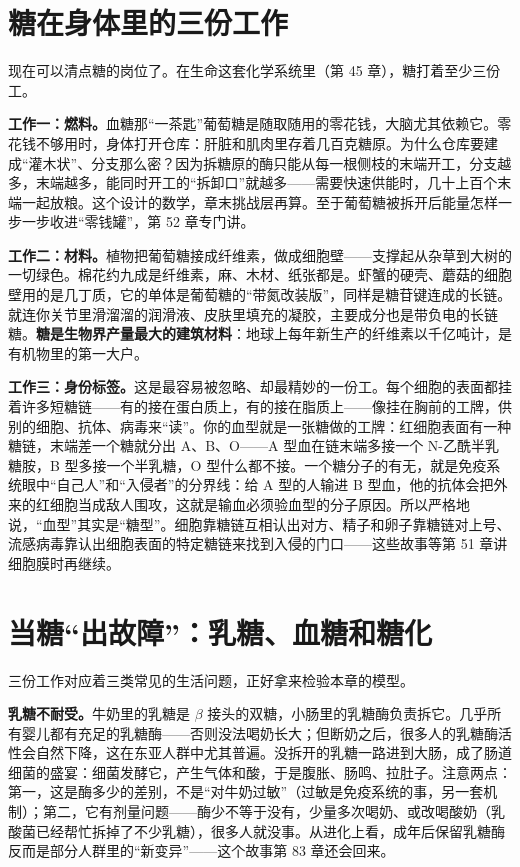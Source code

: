 \section{糖在身体里的三份工作}

现在可以清点糖的岗位了。在生命这套化学系统里（第 45 章），糖打着至少三份工。

\textbf{工作一：燃料。}血糖那“一茶匙”葡萄糖是随取随用的零花钱，大脑尤其依赖它。零花钱不够用时，身体打开仓库：肝脏和肌肉里存着几百克糖原。为什么仓库要建成“灌木状”、分支那么密？因为拆糖原的酶只能从每一根侧枝的末端开工，分支越多，末端越多，能同时开工的“拆卸口”就越多——需要快速供能时，几十上百个末端一起放粮。这个设计的数学，章末挑战层再算。至于葡萄糖被拆开后能量怎样一步一步收进“零钱罐”，第 52 章专门讲。

\textbf{工作二：材料。}植物把葡萄糖接成纤维素，做成细胞壁——支撑起从杂草到大树的一切绿色。棉花约九成是纤维素，麻、木材、纸张都是。虾蟹的硬壳、蘑菇的细胞壁用的是几丁质，它的单体是葡萄糖的“带氮改装版”，同样是糖苷键连成的长链。就连你关节里滑溜溜的润滑液、皮肤里填充的凝胶，主要成分也是带负电的长链糖。\textbf{糖是生物界产量最大的建筑材料}：地球上每年新生产的纤维素以千亿吨计，是有机物里的第一大户。

\textbf{工作三：身份标签。}这是最容易被忽略、却最精妙的一份工。每个细胞的表面都挂着许多短糖链——有的接在蛋白质上，有的接在脂质上——像挂在胸前的工牌，供别的细胞、抗体、病毒来“读”。你的血型就是一张糖做的工牌：红细胞表面有一种糖链，末端差一个糖就分出 A、B、O——A 型血在链末端多接一个 N-乙酰半乳糖胺，B 型多接一个半乳糖，O 型什么都不接。一个糖分子的有无，就是免疫系统眼中“自己人”和“入侵者”的分界线：给 A 型的人输进 B 型血，他的抗体会把外来的红细胞当成敌人围攻，这就是输血必须验血型的分子原因。所以严格地说，“血型”其实是“糖型”。细胞靠糖链互相认出对方、精子和卵子靠糖链对上号、流感病毒靠认出细胞表面的特定糖链来找到入侵的门口——这些故事等第 51 章讲细胞膜时再继续。

\section{当糖“出故障”：乳糖、血糖和糖化}

三份工作对应着三类常见的生活问题，正好拿来检验本章的模型。

\textbf{乳糖不耐受。}牛奶里的乳糖是 $\beta$ 接头的双糖，小肠里的乳糖酶负责拆它。几乎所有婴儿都有充足的乳糖酶——否则没法喝奶长大；但断奶之后，很多人的乳糖酶活性会自然下降，这在东亚人群中尤其普遍。没拆开的乳糖一路进到大肠，成了肠道细菌的盛宴：细菌发酵它，产生气体和酸，于是腹胀、肠鸣、拉肚子。注意两点：第一，这是酶多少的差别，不是“对牛奶过敏”（过敏是免疫系统的事，另一套机制）；第二，它有剂量问题——酶少不等于没有，少量多次喝奶、或改喝酸奶（乳酸菌已经帮忙拆掉了不少乳糖），很多人就没事。从进化上看，成年后保留乳糖酶反而是部分人群里的“新变异”——这个故事第 83 章还会回来。

